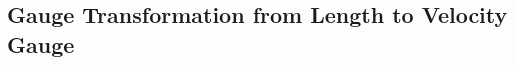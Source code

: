 
%
%



\subsection{Gauge Transformation from Length to Velocity Gauge}
\label{sec:velocity_gauge}

